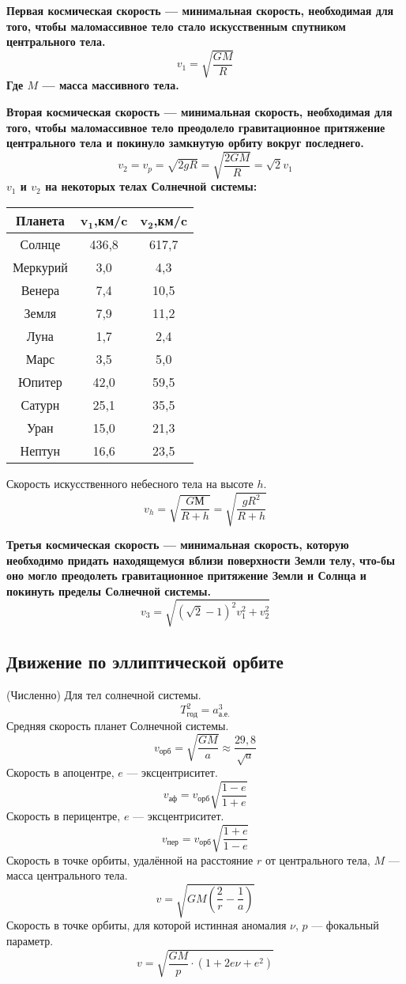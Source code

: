 \documentclass[10pt,a5paper]{article}
\begin{document}
\bfseries Первая космическая скорость \mdseries --- минимальная скорость, необходимая для того, чтобы маломассивное тело стало искусственным спутником центрального тела.
$$v_1=\sqrt{\frac{GM}{R}}$$
Где $M$ --- масса массивного тела.

\bfseries Вторая космическая скорость \mdseries --- минимальная скорость, необходимая для того, чтобы маломассивное тело преодолело гравитационное притяжение центрального тела и покинуло замкнутую орбиту вокруг последнего. 
$$v_2=v_p=\sqrt{2gR}=\sqrt{\frac{2GM}{R}}=\sqrt{2}v_1$$
$v_1$ и $v_2$ на некоторых телах Солнечной системы:
\begin{table}[h!]
\centering
\begin{tabular}{|c|c|c|}
\hline
\textbf{Планета} & $\mathbf{v_1}$,\textbf{км/c} & $\mathbf{v_2}$,\textbf{км/c}\\
\hline
Солнце & 436,8 & 617,7\\
\hline
Меркурий & 3,0 & 4,3\\
\hline
Венера & 7,4 & 10,5\\
\hline
Земля & 7,9 & 11,2\\
\hline
Луна & 1,7 & 2,4\\
\hline
Марс & 3,5 & 5,0\\
\hline
Юпитер & 42,0 & 59,5\\
\hline
Сатурн & 25,1 & 35,5\\
\hline
Уран & 15,0 & 21,3\\
\hline
Нептун & 16,6 & 23,5\\
\hline
\end{tabular}
\end{table}

Скорость искусственного небесного тела на высоте $h$.$$v_h=\sqrt{\frac{GМ}{R+h}}=\sqrt{\frac{gR^2}{R+h}}$$

\bfseries Третья космическая скорость \mdseries --- минимальная скорость, которую необходимо придать находящемуся вблизи поверхности Земли телу, что-бы оно могло преодолеть гравитационное притяжение Земли и Солнца и покинуть пределы Солнечной системы.
$$v_3=\sqrt{(\sqrt{2}-1)^2v^2_1+v^2_2}$$ 
\subsection*{Движение по эллиптической орбите}

(Численно) Для тел солнечной системы.$$T^2_{\text{год}}=a^3_{\text{а.е.}}$$
Средняя скорость планет Солнечной системы.$$v_{\text{орб}}=\sqrt{\frac{GM}{a}}\approx \frac{29,8}{\sqrt{a}}$$
Скорость в апоцентре, $e$ --- эксцентриситет.$$v_{\text{аф}}=v_{\text{орб}}\sqrt{\frac{1-e}{1+e}}$$
Скорость в перицентре, $e$ --- эксцентриситет.$$v_{\text{пер}}=v_{\text{орб}}\sqrt{\frac{1+e}{1-e}}$$
Скорость в точке орбиты, удалённой на расстояние $r$ от центрального тела, $M$ --- масса центрального тела.$$v=\sqrt{GM\left(\frac2r - \frac1a\right)}$$
Скорость в точке орбиты, для которой истинная аномалия $\nu$, $p$ --- фокальный параметр.$$v=\sqrt{\frac{GM}{p}\cdot(1+2e\nu+e^2)}$$
\end{document}
